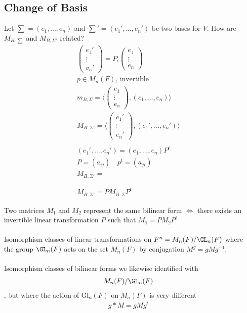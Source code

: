 \documentclass[class=scrartcl, crop=false]{standalone}
\begin{document}
\subsection{Change of Basis}
Let $\sum = (e_1, \dots, e_n)$ and $\sum' = (e_1', \dots, e_n')$ be two bases for $V$. How are $M_{B, \sum}$ and $M_{B, \Sigma'}$ related?
\begin{gather*}
  \begin{pmatrix}
    e_1' \\
    \vdots \\
    v_n'
  \end{pmatrix} = 
  P_i
  \begin{pmatrix}
    e_1 \\
    \vdots \\
    e_n 
  \end{pmatrix} 
  \\
  p \in M_n(F), \ \text{invertible} \ \\
  m_{B, \Sigma} = \langle 
  \begin{pmatrix}
    e_1 \\
    \vdots \\
    e_n
  \end{pmatrix} ,
  (e_1, \dots, e_n) \rangle \\
  M_{B, \Sigma'} = \langle 
  \begin{pmatrix}
    e_1' \\
    \vdots \\
    e_n'
  \end{pmatrix} ,
  (e_1', \dots, e_n') \rangle \\\\
  (e_1', \dots, e_n') = (e_1, \dots, e_n)P^t \\
  P = (a_{ij}) \quad p^t = (a_{ji}) \\
  M_{B, \Sigma'} = 
  \\\\\\
  M_{B, \Sigma'} = PM_{B, \Sigma}P^t
\end{gather*} 

\begin{corollary}
  Two matrices $M_1$ and $M_2$ represent the same bilinear form $\Leftrightarrow$ there exists an invertible linear transformation $P$ such that $M_1 = PM_2P^t$ \\\\
  Isomorphism classes of linear transformations on $F^n = M_n(F) / \GL_n(F)$ where the group $\GL_n(F)$  acts on the set $M_n(F)$ by conjugation $M^g = gMg^{-1}$. \\\\
  Isomorphism classes of bilinear forms we likewise identified with 
  \begin{gather*}
    M_n(F) / \GL_n(F)
  \end{gather*} ,
  but where the action of $\text{Gl}_n(F)$ on  $M_n(F)$ is very different
  \begin{gather*}
    g * M = gMg^t
  \end{gather*} 
\end{corollary} 
\end{document}
